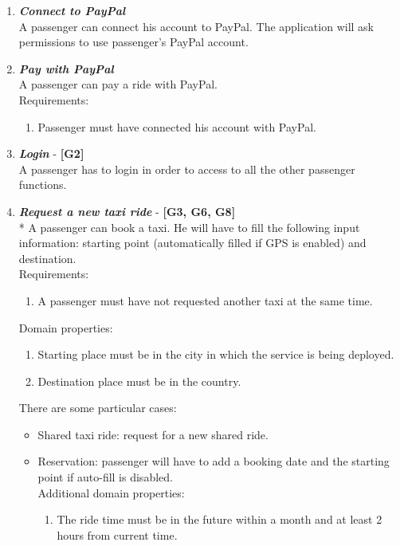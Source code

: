 \documentclass{article}
\begin{document}
\begin{enumerate}
\item \textit{\textbf{Connect to PayPal}}\\
A passenger can connect his account to PayPal. The application will ask permissions to use passenger's PayPal account.
\item \textit{\textbf{Pay with PayPal}}\\
A passenger can pay a ride with PayPal.\\
Requirements:
\begin{enumerate}
\item Passenger must have connected his account with PayPal.
\end{enumerate}

\item \textit{\textbf{Login}} - \textbf{[G2]}\\
A passenger has to login in order to access to all the other passenger functions.

\item \textit{\textbf{Request a new taxi ride}} - \textbf{[G3, G6, G8]}\\*
A passenger can book a taxi. He will have to fill the following input information: starting point (automatically filled if GPS is enabled) and destination.\\
Requirements:
\begin{enumerate}
\item A passenger must have not requested another taxi at the same time.
\end{enumerate}
Domain properties:
\begin{enumerate}
\item Starting place must be in the city in which the service is being deployed.
\item Destination place must be in the country.
\end{enumerate}
There are some particular cases:
\begin{itemize}
\item Shared taxi ride: request for a new shared ride.
\item Reservation: passenger will have to add a booking date and the starting point if auto-fill is disabled.\\
Additional domain properties:
\begin{enumerate}
\item The ride time must be in the future within a month and at least 2 hours from current time.
\end{enumerate}
\end{itemize}


\end{enumerate}
\end{document}
